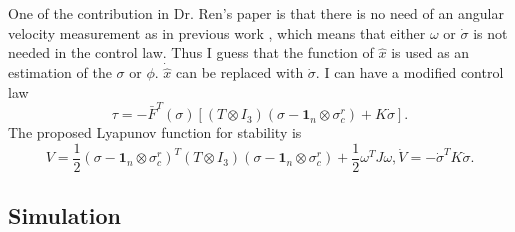 One of the contribution in Dr. Ren's paper \cite{5229134} is that there is no need of an angular velocity measurement as in previous work \cite{4777127}, which means that either $ \omega $ or $ \dot{ \sigma } $ is not needed in the control law. 
Thus I guess that the function of $ \hat{x} $ is used as an estimation of the $ \sigma $ or $ \phi $. 
$ \dot{ \hat{x} } $ can be replaced with $ \dot{ \sigma } $. 
I can have a modified control law
\begin{equation}
\label{eq:coop_att_syn:ctrl_law:mult_agt:3}
\tau = - \bar{F}^{T}(\sigma) [ ( T \otimes I_{3} )( \sigma - \mathbf{1}_{n} \otimes \sigma^{r}_{c} ) + K \dot{ \sigma } ] .
\end{equation}
The proposed Lyapunov function for stability is
\begin{subequations}
\label{eq:coop_att_sync:lyapunov_func:3}
\begin{equation}
V = \frac{1}{2} ( \sigma - \mathbf{1}_{n} \otimes \sigma^{r}_{c} )^{T} ( T \otimes I_{3} ) ( \sigma - \mathbf{1}_{n} \otimes \sigma^{r}_{c} ) + \frac{1}{2} \omega^{T} J \omega ,
\end{equation}
\begin{equation}
\dot{V} = - \dot{\sigma}^{T} K \dot{\sigma}.
\end{equation}
\end{subequations}

\subsection{Simulation}
\label{sec:coop_att_syn:sims}

